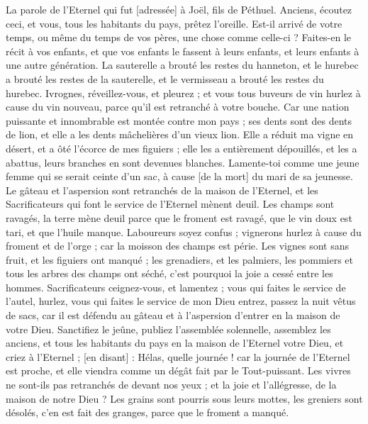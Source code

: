 \BFont
\begin{multicols}{2}
\VerseOne{}La parole de l'Eternel qui fut [adressée] à Joël, fils de Péthuel.
Anciens, écoutez ceci, et vous, tous les habitants du pays, prêtez l'oreille. Est-il arrivé de votre temps, ou même du temps de vos pères, une chose comme celle-ci ?
Faites-en le récit à vos enfants, et que vos enfants le fassent à leurs enfants, et leurs enfants à une autre génération.
La sauterelle a brouté les restes du hanneton, et le hurebec a brouté les restes de la sauterelle, et le vermisseau a brouté les restes du hurebec.
Ivrognes, réveillez-vous, et pleurez ; et vous tous buveurs de vin hurlez à cause du vin nouveau, parce qu'il est retranché à votre bouche.
Car une nation puissante et innombrable est montée contre mon pays ; ses dents sont des dents de lion, et elle a les dents mâchelières d'un vieux lion.
Elle a réduit ma vigne en désert, et a ôté l'écorce de mes figuiers ; elle les a entièrement dépouillés, et les a abattus, leurs branches en sont devenues blanches.
Lamente-toi comme une jeune femme qui se serait ceinte d'un sac, à cause [de la mort] du mari de sa jeunesse.
Le gâteau et l'aspersion sont retranchés de la maison de l'Eternel, et les Sacrificateurs qui font le service de l'Eternel mènent deuil.
Les champs sont ravagés, la terre mène deuil parce que le froment est ravagé, que le vin doux est tari, et que l'huile manque.
Laboureurs soyez confus ; vignerons hurlez à cause du froment et de l'orge ; car la moisson des champs est périe.
Les vignes sont sans fruit, et les figuiers ont manqué ; les grenadiers, et les palmiers, les pommiers et tous les arbres des champs ont séché, c'est pourquoi la joie a cessé entre les hommes.
Sacrificateurs ceignez-vous, et lamentez ; vous qui faites le service de l'autel, hurlez, vous qui faites le service de mon Dieu entrez, passez la nuit vêtus de sacs, car il est défendu au gâteau et à l'aspersion d'entrer en la maison de votre Dieu.
Sanctifiez le jeûne, publiez l'assemblée solennelle, assemblez les anciens, et tous les habitants du pays en la maison de l'Eternel votre Dieu, et criez à l'Eternel ; [en disant] :
Hélas, quelle journée ! car la journée de l'Eternel est proche, et elle viendra comme un dégât fait par le Tout-puissant.
Les vivres ne sont-ils pas retranchés de devant nos yeux ; et la joie et l'allégresse, de la maison de notre Dieu ?
Les grains sont pourris sous leurs mottes, les greniers sont désolés, c'en est fait des granges, parce que le froment a manqué.

\end{multicols}
